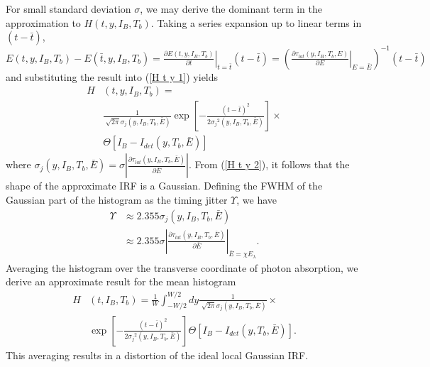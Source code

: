 \documentclass[%
reprint,
 amsmath,amssymb,
aps,
pra,
]{revtex4-1}
\begin{document}
\quad For small standard deviation \(\sigma\), we may derive the dominant term in the approximation to \(H\left(t, y,I_B,T_b\right)\).  Taking a series expansion up to linear terms in \(\left(t - \bar{t}\right)\), \(E\left(t, y,I_B,T_b\right) - E\left(\bar{t}, y,I_B,T_b\right) = \displaystyle{\left.\frac{\partial E\left(t, y,I_B,T_b\right)}{\partial t}\right|_{t=\bar{t}}\left(t - \bar{t}\right)} = \left(\left.\frac{\partial\tau_{lat}(y,I_B,T_b,E)}{\partial E}\right|_{E=\bar{E}}\right)^{-1} \left(t - \bar{t}\right)\) and substituting the result into (\ref{H t y 1}) yields 
\begin{equation}\label{H t y 2}
\begin{aligned}
H&(t, y,I_B,T_b)= \\
&\frac{1}{\sqrt[]{2\pi}\sigma_j\left(y,I_B,T_b,\bar{E}\right)}\exp\left[-\frac{\left(t - \bar{t}\right)^2}{2{\sigma_j}^2\left(y,I_B,T_b,\bar{E}\right)}\right]\times \\
&\Theta\left[I_B-I_{det}(y,T_b,\bar{E})\right]
\end{aligned}
\end{equation}
where \(\displaystyle{\sigma_j\left(y,I_B,T_b,\bar{E}\right) = \sigma\left|\frac{\partial \tau_{lat}(y,I_B,T_b,\bar{E})}{\partial\bar{E}}\right|}\).  From (\ref{H t y 2}), it follows that the shape of the approximate IRF is a Gaussian. Defining the FWHM of the Gaussian part of the histogram as the timing jitter \(\Upsilon\), we have 
\begin{equation}\label{T Jitter}
\begin{aligned}
\Upsilon&\approx 2.355\sigma_j\left(y,I_B,T_b,\bar{E}\right)\\
&{}\approx 2.355\sigma\left|\frac{\partial \tau_{lat}(y,I_B,T_b,\bar{E})}{\partial\bar{E}}\right|_{\bar{E}=\chi E_\lambda} \text{.}
\end{aligned}
\end{equation}
Averaging the histogram over the transverse coordinate of photon absorption, we derive an approximate result for the mean histogram
\begin{equation}\label{mean T Jitter}
\begin{aligned}
H&(t, I_B,T_b)= \frac{1}{W}\int_{-W/2}^{W/2}dy \frac{1}{\sqrt[]{2\pi}\sigma_j\left(y,I_B,T_b,\bar{E}\right)}\times \\
&\exp\left[-\frac{\left(t - \bar{t}\right)^2}{2{\sigma_j}^2\left(y,I_B,T_b,\bar{E}\right)}\right]\Theta\left[I_B-I_{det}(y,T_b,\bar{E})\right]\text{.}
\end{aligned}
\end{equation}
This averaging results in a distortion of the ideal local Gaussian IRF.  
\end{document}
